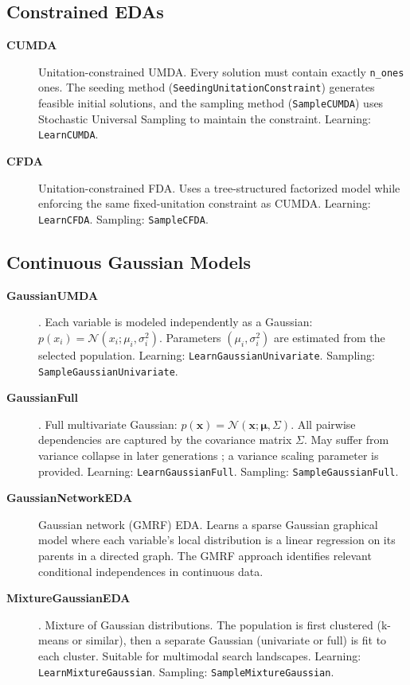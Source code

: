 \documentclass[a4paper,11pt]{article}
\begin{document}
\subsection{Constrained EDAs}
\label{sec:constrained}

\begin{description}
  \item[\textbf{CUMDA}]
    Unitation-constrained UMDA.  Every solution must contain exactly
    \texttt{n\_ones} ones.  The seeding method
    (\texttt{SeedingUnitationConstraint}) generates feasible initial
    solutions, and the sampling method (\texttt{SampleCUMDA}) uses
    Stochastic Universal Sampling to maintain the constraint.
    Learning: \texttt{LearnCUMDA}.

  \item[\textbf{CFDA}]
    Unitation-constrained FDA.  Uses a tree-structured factorized model
    while enforcing the same fixed-unitation constraint as CUMDA.
    Learning: \texttt{LearnCFDA}. Sampling: \texttt{SampleCFDA}.
\end{description}

\subsection{Continuous Gaussian Models}
\label{sec:gaussian}

\begin{description}
  \item[\textbf{GaussianUMDA}] \citep{Larranhaga_et_al:1999,Larranhaga_et_al:2000}.
    Each variable is modeled independently as a Gaussian:
    $p(x_i) = \mathcal{N}(x_i; \mu_i, \sigma_i^2)$.
    Parameters $(\mu_i, \sigma_i^2)$ are estimated from the selected population.
    Learning: \texttt{LearnGaussianUnivariate}. Sampling: \texttt{SampleGaussianUnivariate}.

  \item[\textbf{GaussianFull}] \citep{Larranhaga_et_al:2000,Bosman_and_Thierens:2000}.
    Full multivariate Gaussian: $p(\mathbf{x}) = \mathcal{N}(\mathbf{x};\boldsymbol{\mu},\Sigma)$.
    All pairwise dependencies are captured by the covariance matrix $\Sigma$.
    May suffer from variance collapse in later generations
    \citep{Bosman_and_Grahl:2008}; a variance scaling parameter is provided.
    Learning: \texttt{LearnGaussianFull}. Sampling: \texttt{SampleGaussianFull}.

  \item[\textbf{GaussianNetworkEDA}]
    Gaussian network (GMRF) EDA.  Learns a sparse Gaussian graphical model
    where each variable's local distribution is a linear regression on its
    parents in a directed graph.  The GMRF approach identifies relevant
    conditional independences in continuous data.

  \item[\textbf{MixtureGaussianEDA}] \citep{Bosman_and_Thierens:2002}.
    Mixture of Gaussian distributions.  The population is first clustered
    (k-means or similar), then a separate Gaussian (univariate or full) is
    fit to each cluster.  Suitable for multimodal search landscapes.
    Learning: \texttt{LearnMixtureGaussian}. Sampling: \texttt{SampleMixtureGaussian}.
\end{description}
\end{document}
